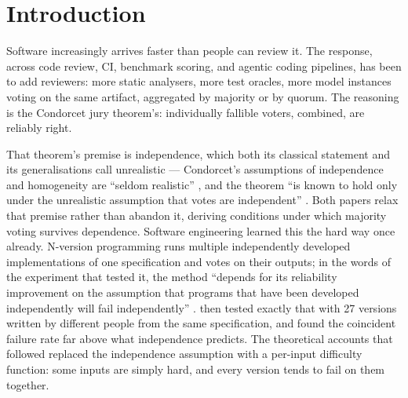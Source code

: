 \documentclass[11pt,a4paper]{article}
\begin{document}
\begin{abstract}
The practical conclusion is deliberately scoped: measure discrimination,
failure-count structure, and blind spots on the panel you actually have rather
than inferring independence from head count or declared diversity. Verifiers
sharing no declared region in this constructed panel still share $53\%$ of their
errors. Every quantitative finding rests on one 25-oracle, 72-item instrument;
it does not establish that LLM judges or other verifier families share the same
dependence shape. Code, artifacts, and the analysis pipeline are public.
\end{abstract}

\section{Introduction}

Software increasingly arrives faster than people can review it. The response,
across code review, CI, benchmark scoring, and agentic coding pipelines, has been
to add reviewers: more static analysers, more test oracles, more model instances
voting on the same artifact, aggregated by majority or by quorum. The reasoning
is the Condorcet jury theorem's: individually fallible voters, combined, are
reliably right.

That theorem's premise is independence, which both its classical statement and
its generalisations call unrealistic --- Condorcet's assumptions of independence
and homogeneity are ``seldom realistic'' \citep{boland1989}, and the theorem
``is known to hold only under the unrealistic assumption that votes are
independent'' \citep{ladha1992}. Both papers relax that premise rather than
abandon it, deriving conditions under which majority voting survives dependence. Software engineering learned this the hard
way once already. N-version programming \citep{avizienis1977} runs multiple
independently developed implementations of one specification and votes on their
outputs; in the words of the experiment that tested it, the method ``depends for
its reliability improvement on the assumption that programs that have been
developed independently will fail independently'' \citep{knight1986}.
\citet{knight1986} then tested exactly that with 27 versions written by different
people from the same specification, and found the coincident failure rate far
above what independence predicts. The theoretical accounts that followed
\citep{eckhardt1985,littlewood1989} replaced the independence assumption with a
per-input difficulty function: some inputs are simply hard, and every version
tends to fail on them together.
\end{document}
